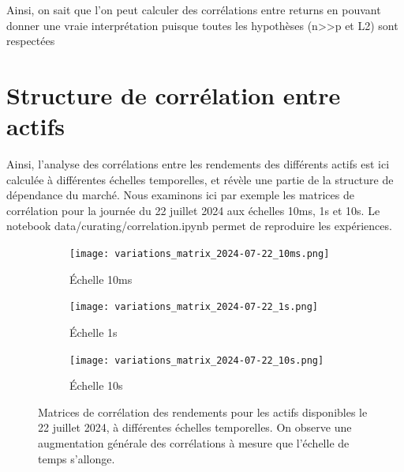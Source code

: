 \documentclass[10pt,a4paper]{article}
\theoremstyle{definition}
\theoremstyle{remark}
\begin{document}
\begin{itemize}
Ainsi, on sait que l'on peut calculer des corrélations entre returns en pouvant donner une vraie interprétation puisque toutes les hypothèses (n>>p et L2) sont respectées

\newpage
\section{Structure de corrélation entre actifs}

Ainsi, l'analyse des corrélations entre les rendements des différents actifs est ici calculée à différentes échelles temporelles, et révèle une partie de la structure de dépendance du marché. 
Nous examinons ici par exemple les matrices de corrélation pour la journée du 22 juillet 2024 aux échelles 10ms, 1s et 10s. Le notebook data/curating/correlation.ipynb permet de reproduire les expériences.

\begin{figure}[H] %
    \centering
    \begin{subfigure}[b]{0.32\textwidth} %
        \centering %
        \texttt{[image: variations\_matrix\_2024-07-22\_10ms.png]} %
        \caption{Échelle 10ms}
        \label{fig:corr_10ms}
    \end{subfigure}
    \hfill %
    \begin{subfigure}[b]{0.32\textwidth} %
        \centering %
        \texttt{[image: variations\_matrix\_2024-07-22\_1s.png]} %
        \caption{Échelle 1s}
        \label{fig:corr_1s}
    \end{subfigure}
    \hfill %
    \begin{subfigure}[b]{0.32\textwidth} %
        \centering %
        \texttt{[image: variations\_matrix\_2024-07-22\_10s.png]} %
        \caption{Échelle 10s}
        \label{fig:corr_10s}
    \end{subfigure}
    \caption{Matrices de corrélation des rendements pour les actifs disponibles le 22 juillet 2024, à différentes échelles temporelles. On observe une augmentation générale des corrélations à mesure que l'échelle de temps s'allonge.}
    \label{fig:correlation_matrices_multiscale}
\end{figure}


\end{itemize}
\end{document}
